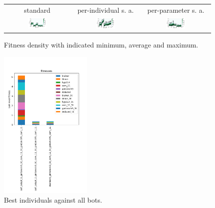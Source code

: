 \documentclass[11pt,a4paper]{scrartcl}
\begin{document}
\begin{figure}[H]
\center
\begin{tabular}{ccc}
standard & per-individual s. a. & per-parameter s. a. \\
\includegraphics[width=0.3\textwidth]{img/standard_gintonicV9_5t_com_11_5t_gintonicV9_com_11.png} &
\includegraphics[width=0.3\textwidth]{img/self_adapt_1_gintonicV9_5t_com_11_5t_gintonicV9_com_11.png} &
\includegraphics[width=0.3\textwidth]{img/self_adapt_2_gintonicV9_5t_com_11_5t_gintonicV9_com_11.png} \\
\end{tabular}
\caption{Fitness density with indicated minimum, average and maximum.}
\label{fig:changing opponent}
\end{figure}

\begin{figure}[H]
\center
\includegraphics[width=0.4\textwidth]{img/change.png}
\caption{Best individuals against all bots.}
\label{fig:change}
\end{figure}
\end{document}
